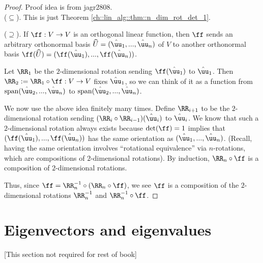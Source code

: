 \begin{proof}
    \scriptsize Proof idea is from jagr2808. 
    \fontsize{10pt}{12pt}\selectfont \\
    \indent ($\subseteq$). This is just Theorem \ref{ch::lin_alg::thm::n_dim_rot_det_1}.
    
    \indent ($\supseteq$). If $\ff:V \rightarrow V$ is an orthogonal linear function, then $\ff$ sends an arbitrary orthonormal basis $\hU = (\huu_1, ..., \huu_n)$ of $V$ to another orthonormal basis $\ff(\hU) = (\ff(\huu_1), ..., \ff(\huu_n))$.

    Let $\RR_1$ be the $2$-dimensional rotation sending $\ff(\huu_1)$ to $\huu_1$. Then $\RR_2 := \RR_1 \circ \ff:V \rightarrow V$ fixes $\huu_1$, so we can think of it as a function from $\spann(\huu_2, ..., \huu_n)$ to $\spann(\huu_2, ..., \huu_n)$. 
    
    We now use the above idea finitely many times. Define $\RR_{i + 1}$ to be the $2$-dimensional rotation sending ${(\RR_i \circ \RR_{i - 1})(\huu_i)}$ to $\huu_i$. We know that such a $2$-dimensional rotation always exists because $\det(\ff) = 1$ implies that $(\ff(\huu_1), ..., \ff(\huu_n))$ has the same orientation as $(\huu_1, ..., \huu_n)$. (Recall, having the same orientation involves ``rotational equivalence'' via $n$-rotations, which are compositions of $2$-dimensional rotations). By induction, $\RR_n \circ \ff$ is a composition of $2$-dimensional rotations.
    
    Thus, since $\ff = \RR_n^{-1} \circ (\RR_n \circ \ff)$, we see $\ff$ is a composition of the $2$-dimensional rotations $\RR_n^{-1}$ and $\RR_n^{-1} \circ \ff$.
    

\end{proof}

\section{Eigenvectors and eigenvalues}

[This section not required for rest of book]

